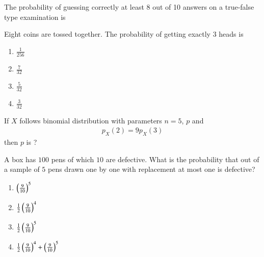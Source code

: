 \solution

\item The probability of guessing correctly at least 8 out of 10 answers on a true-false
type examination is\\
\solution
\item Eight coins are tossed together. The probability of getting exactly 3 heads is\\
\begin{enumerate}
    \item 
    $\frac{1}{256}$\\
    \item 
    $\frac{7}{32}$\\
    \item 
    $\frac{5}{32}$\\
    \item 
    $\frac{3}{32}$\\
\end{enumerate}

\item If $X$ follows binomial distribution with parameters $n = 5$, $p$ and 
\begin{align}
    p_X(2) = 9p_X(3)
\end{align}
then $p$ is ?

\item A box has $100$ pens of which $10$ are defective. What is the probability that out of a sample of $5$ pens drawn one by one with replacement at most one is defective?
\begin{enumerate}[label=(\alph*)]
    \item $\left(\frac{9}{10}\right)^5$
    \item $\frac{1}{2}\left(\frac{9}{10}\right)^4$
    \item $\frac{1}{2}\left(\frac{9}{10}\right)^5$
    \item $\frac{1}{2}\left(\frac{9}{10}\right)^4 + \left(\frac{9}{10}\right)^5$
\end{enumerate}
